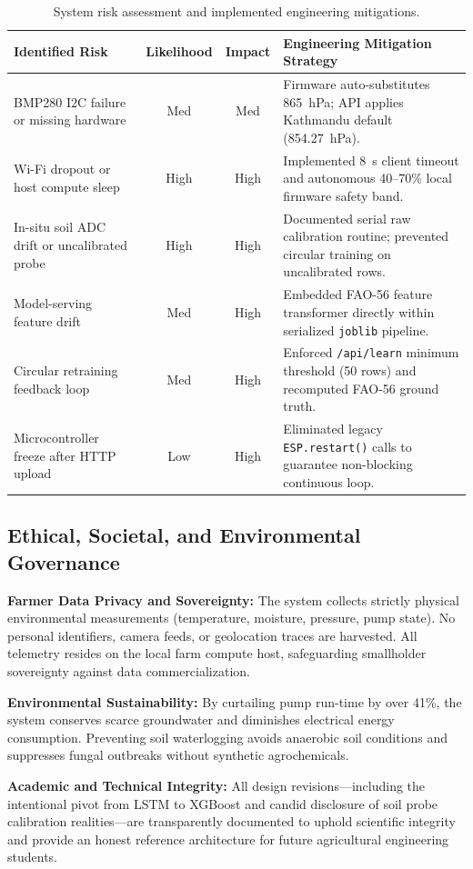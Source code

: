 \documentclass[12pt, a4paper]{article}
\begin{document}
\begin{table}[H]
\centering
\caption{System risk assessment and implemented engineering mitigations.}
\label{tab:risks}
\begin{tabularx}{\textwidth}{>{\raggedright\arraybackslash}p{3.4cm} c c X}
\toprule
\textbf{Identified Risk} & \textbf{Likelihood} & \textbf{Impact} & \textbf{Engineering Mitigation Strategy} \\
\midrule
BMP280 I2C failure or missing hardware & Med & Med & Firmware auto-substitutes 865~hPa; API applies Kathmandu default (854.27~hPa). \\
Wi-Fi dropout or host compute sleep & High & High & Implemented 8~s client timeout and autonomous 40--70\% local firmware safety band. \\
In-situ soil ADC drift or uncalibrated probe & High & High & Documented serial raw calibration routine; prevented circular training on uncalibrated rows. \\
Model-serving feature drift & Med & High & Embedded FAO-56 feature transformer directly within serialized \texttt{joblib} pipeline. \\
Circular retraining feedback loop & Med & High & Enforced \texttt{/api/learn} minimum threshold (50 rows) and recomputed FAO-56 ground truth. \\
Microcontroller freeze after HTTP upload & Low & High & Eliminated legacy \texttt{ESP.restart()} calls to guarantee non-blocking continuous loop. \\
\bottomrule
\end{tabularx}
\end{table}

\subsection{Ethical, Societal, and Environmental Governance}
\label{app:ethics}

\textbf{Farmer Data Privacy and Sovereignty:} The system collects strictly physical environmental measurements (temperature, moisture, pressure, pump state). No personal identifiers, camera feeds, or geolocation traces are harvested. All telemetry resides on the local farm compute host, safeguarding smallholder sovereignty against data commercialization.

\textbf{Environmental Sustainability:} By curtailing pump run-time by over 41\%, the system conserves scarce groundwater and diminishes electrical energy consumption. Preventing soil waterlogging avoids anaerobic soil conditions and suppresses fungal outbreaks without synthetic agrochemicals.

\textbf{Academic and Technical Integrity:} All design revisions—including the intentional pivot from LSTM to XGBoost and candid disclosure of soil probe calibration realities—are transparently documented to uphold scientific integrity and provide an honest reference architecture for future agricultural engineering students.
\end{document}
